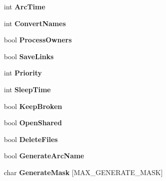 \begin{DoxyCompactItemize}
\item 
\hypertarget{class_r_a_r_options_ab3d5c7b3e8248161088c61c1f7197a4b}{int {\bfseries Arc\-Time}}\label{class_r_a_r_options_ab3d5c7b3e8248161088c61c1f7197a4b}

\item 
\hypertarget{class_r_a_r_options_ac6251311478e5480ebd3c38faa439a86}{int {\bfseries Convert\-Names}}\label{class_r_a_r_options_ac6251311478e5480ebd3c38faa439a86}

\item 
\hypertarget{class_r_a_r_options_aa37cecd8162d64513b95637f6ec482f4}{bool {\bfseries Process\-Owners}}\label{class_r_a_r_options_aa37cecd8162d64513b95637f6ec482f4}

\item 
\hypertarget{class_r_a_r_options_a568f370a5ea021fc0c3bfb7a2903c5fa}{bool {\bfseries Save\-Links}}\label{class_r_a_r_options_a568f370a5ea021fc0c3bfb7a2903c5fa}

\item 
\hypertarget{class_r_a_r_options_a4397b4c137b9c2c15f7a567d10843a83}{int {\bfseries Priority}}\label{class_r_a_r_options_a4397b4c137b9c2c15f7a567d10843a83}

\item 
\hypertarget{class_r_a_r_options_aa7e7d80585f353c8d1e0e50946ce928e}{int {\bfseries Sleep\-Time}}\label{class_r_a_r_options_aa7e7d80585f353c8d1e0e50946ce928e}

\item 
\hypertarget{class_r_a_r_options_a4ca15ca12aed1f3b1466d5f70bbc49c6}{bool {\bfseries Keep\-Broken}}\label{class_r_a_r_options_a4ca15ca12aed1f3b1466d5f70bbc49c6}

\item 
\hypertarget{class_r_a_r_options_ad71b222373cb6e44d4d728f0d17f6b23}{bool {\bfseries Open\-Shared}}\label{class_r_a_r_options_ad71b222373cb6e44d4d728f0d17f6b23}

\item 
\hypertarget{class_r_a_r_options_affaac2325dce4ced95f1fefe8fb986ac}{bool {\bfseries Delete\-Files}}\label{class_r_a_r_options_affaac2325dce4ced95f1fefe8fb986ac}

\item 
\hypertarget{class_r_a_r_options_a40317089149416e9a63cf385dc70f099}{bool {\bfseries Generate\-Arc\-Name}}\label{class_r_a_r_options_a40317089149416e9a63cf385dc70f099}

\item 
\hypertarget{class_r_a_r_options_ad48e9c2da43dd5337efde4e34422f116}{char {\bfseries Generate\-Mask} \mbox{[}M\-A\-X\-\_\-\-G\-E\-N\-E\-R\-A\-T\-E\-\_\-\-M\-A\-S\-K\mbox{]}}\label{class_r_a_r_options_ad48e9c2da43dd5337efde4e34422f116}


\end{DoxyCompactItemize}
